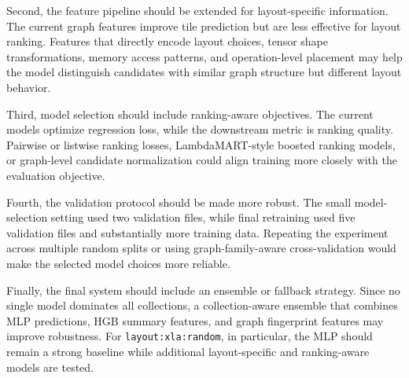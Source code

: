 \documentclass[11pt]{article}
\begin{document}
Second, the feature pipeline should be extended for layout-specific information. The current graph features improve tile prediction but are less effective for layout ranking. Features that directly encode layout choices, tensor shape transformations, memory access patterns, and operation-level placement may help the model distinguish candidates with similar graph structure but different layout behavior.

Third, model selection should include ranking-aware objectives. The current models optimize regression loss, while the downstream metric is ranking quality. Pairwise or listwise ranking losses, LambdaMART-style boosted ranking models, or graph-level candidate normalization could align training more closely with the evaluation objective.

Fourth, the validation protocol should be made more robust. The small model-selection setting used two validation files, while final retraining used five validation files and substantially more training data. Repeating the experiment across multiple random splits or using graph-family-aware cross-validation would make the selected model choices more reliable.

Finally, the final system should include an ensemble or fallback strategy. Since no single model dominates all collections, a collection-aware ensemble that combines MLP predictions, HGB summary features, and graph fingerprint features may improve robustness. For \texttt{layout:xla:random}, in particular, the MLP should remain a strong baseline while additional layout-specific and ranking-aware models are tested.
\end{document}
